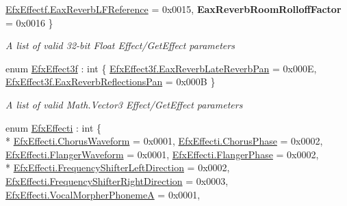 \begin{DoxyCompactItemize}
\hyperlink{namespace_open_t_k_1_1_audio_1_1_open_a_l_aa0356299908369b4365d28572c0ec20bad8e694171d1a74dad6e9a8bc6d56e7b1}{Efx\-Effectf.\-Eax\-Reverb\-L\-F\-Reference} = 0x0015, 
{\bfseries Eax\-Reverb\-Room\-Rolloff\-Factor} = 0x0016
 \}
\begin{DoxyCompactList}\small\item\em A list of valid 32-\/bit Float Effect/\-Get\-Effect parameters\end{DoxyCompactList}\item 
enum \hyperlink{namespace_open_t_k_1_1_audio_1_1_open_a_l_a1c69083823578d237ab570da681a5cfa}{Efx\-Effect3f} \-: int \{ \hyperlink{namespace_open_t_k_1_1_audio_1_1_open_a_l_a1c69083823578d237ab570da681a5cfaae07987f57163a83dff190cd42f333027}{Efx\-Effect3f.\-Eax\-Reverb\-Late\-Reverb\-Pan} = 0x000\-E, 
\hyperlink{namespace_open_t_k_1_1_audio_1_1_open_a_l_a1c69083823578d237ab570da681a5cfaac843ae755c77f4a140abdbe9486af244}{Efx\-Effect3f.\-Eax\-Reverb\-Reflections\-Pan} = 0x000\-B
 \}
\begin{DoxyCompactList}\small\item\em A list of valid Math.\-Vector3 Effect/\-Get\-Effect parameters\end{DoxyCompactList}\item 
enum \hyperlink{namespace_open_t_k_1_1_audio_1_1_open_a_l_a49039c1ddcb53675576ad2780fc50315}{Efx\-Effecti} \-: int \{ \\*
\hyperlink{namespace_open_t_k_1_1_audio_1_1_open_a_l_a49039c1ddcb53675576ad2780fc50315a0438189b004fb8b751cca7afe9e0f2d1}{Efx\-Effecti.\-Chorus\-Waveform} = 0x0001, 
\hyperlink{namespace_open_t_k_1_1_audio_1_1_open_a_l_a49039c1ddcb53675576ad2780fc50315a77d4a7a7be689cbe3f3637f75442106a}{Efx\-Effecti.\-Chorus\-Phase} = 0x0002, 
\hyperlink{namespace_open_t_k_1_1_audio_1_1_open_a_l_a49039c1ddcb53675576ad2780fc50315a675fde11a59a472add88615a716e8be3}{Efx\-Effecti.\-Flanger\-Waveform} = 0x0001, 
\hyperlink{namespace_open_t_k_1_1_audio_1_1_open_a_l_a49039c1ddcb53675576ad2780fc50315a7f86e4ba171917c100338ff40d9b9940}{Efx\-Effecti.\-Flanger\-Phase} = 0x0002, 
\\*
\hyperlink{namespace_open_t_k_1_1_audio_1_1_open_a_l_a49039c1ddcb53675576ad2780fc50315a8e7fd11c4dc674c13bd8cf6f67e5c285}{Efx\-Effecti.\-Frequency\-Shifter\-Left\-Direction} = 0x0002, 
\hyperlink{namespace_open_t_k_1_1_audio_1_1_open_a_l_a49039c1ddcb53675576ad2780fc50315aed2f20bb52ca8cbfe85319180b54fdb8}{Efx\-Effecti.\-Frequency\-Shifter\-Right\-Direction} = 0x0003, 
\hyperlink{namespace_open_t_k_1_1_audio_1_1_open_a_l_a49039c1ddcb53675576ad2780fc50315a1e1a85b0d302670bf80cc1e2b9b7eca8}{Efx\-Effecti.\-Vocal\-Morpher\-Phoneme\-A} = 0x0001, 

\end{DoxyCompactItemize}
